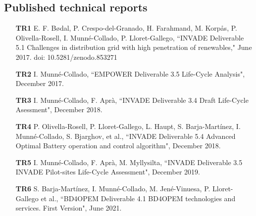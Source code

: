 \subsection*{Published technical reports}

\begin{itemize}
	\item[\textbf{TR1}] E. F. B\o{}dal, P. Crespo-del-Granado, H. Farahmand, M. Korp\aa{}s, P. Olivella-Rosell, I. Munn\'{e}-Collado, P. Lloret-Gallego, ``INVADE Deliverable 5.1 Challenges in distribution grid with high penetration of renewables," June 2017. doi: 10.5281/zenodo.853271
	\item[\textbf{TR2}] I. Munn\'{e}-Collado, ``EMPOWER Deliverable 3.5 Life-Cycle Analysis", December 2017.
	\item[\textbf{TR3}] I. Munn\'{e}-Collado, F. Apr\`{a}, ``INVADE Deliverable 3.4 Draft Life-Cycle Asessment", December 2018.
	\item[\textbf{TR4}] P. Olivella-Rosell, P. Lloret-Gallego, L. Haupt, S. Barja-Mart\'{i}nez, I. Munn\'{e}-Collado, S. Bjarghov, et al., ``INVADE Deliverable 5.4 Advanced Optimal Battery operation and control algorithm", December 2018.
	\item[\textbf{TR5}] I. Munn\'{e}-Collado, F. Apr\`{a}, M. Myllysilta, ``INVADE Deliverable 3.5 INVADE Pilot-sites Life-Cycle Assessment", December 2019.	
	\item[\textbf{TR6}] S. Barja-Mart\'{i}nez, I. Munn\'{e}-Collado, M. Jen\'{e}-Vinuesa, P. Lloret-Gallego et al., ``BD4OPEM Deliverable 4.1 BD4OPEM technologies and services. First Version", June 2021.	
\end{itemize}
